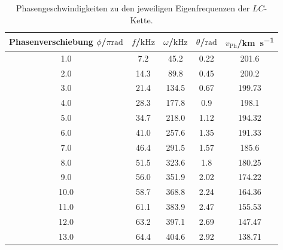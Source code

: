 \begin{table}
	\caption{Phasengeschwindigkeiten zu den jeweiligen Eigenfrequenzen der $LC$-Kette.}
	\label{tab:c}
	\centering
	\begin{tabular}{ccccc}
		\toprule
		Phasenverschiebung $\phi$/$\pi\si{\radian}$ & $f$/$\si{\kilo\Hz}$ & $\omega$/$\si{\kilo\Hz}$ & $\theta$/$\si{\radian}$ & $v_{\mathrm{Ph}}$/\si{\kilo\metre\per\second} \\
		\midrule
		1.0                                         & 7.2                 & 45.2                     & 0.22                    & 201.6                                         \\
		2.0                                         & 14.3                & 89.8                     & 0.45                    & 200.2                                         \\
		3.0                                         & 21.4                & 134.5                    & 0.67                    & 199.73                                        \\
		4.0                                         & 28.3                & 177.8                    & 0.9                     & 198.1                                         \\
		5.0                                         & 34.7                & 218.0                    & 1.12                    & 194.32                                        \\
		6.0                                         & 41.0                & 257.6                    & 1.35                    & 191.33                                        \\
		7.0                                         & 46.4                & 291.5                    & 1.57                    & 185.6                                         \\
		8.0                                         & 51.5                & 323.6                    & 1.8                     & 180.25                                        \\
		9.0                                         & 56.0                & 351.9                    & 2.02                    & 174.22                                        \\
		10.0                                        & 58.7                & 368.8                    & 2.24                    & 164.36                                        \\
		11.0                                        & 61.1                & 383.9                    & 2.47                    & 155.53                                        \\
		12.0                                        & 63.2                & 397.1                    & 2.69                    & 147.47                                        \\
		13.0                                        & 64.4                & 404.6                    & 2.92                    & 138.71                                        \\
		\bottomrule
	\end{tabular}
\end{table}
